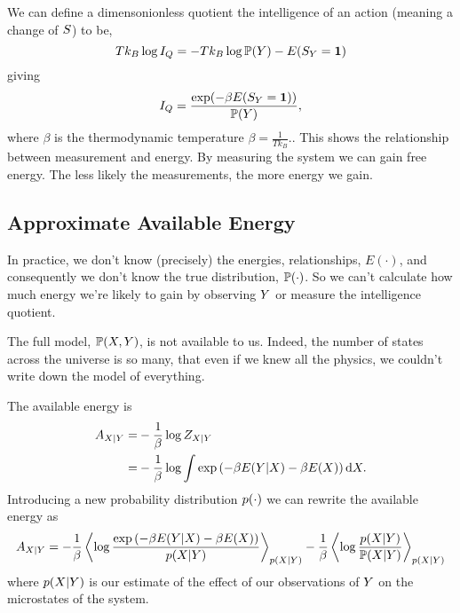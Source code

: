 \documentclass[]{article}
\begin{document}
We can define a dimensonionless quotient the intelligence of an action (meaning a change of $S$) to be,
\[
T k_B\log I_Q = -T k_B \log \mathbb{P}(Y) - E(S_Y=\mathbf{1})
\]
giving 
\[
I_Q = \frac{\exp(-\beta E(S_Y=\mathbf{1}))}{\mathbb{P}(Y)},\]
where $\beta$ is the thermodynamic temperature
\(
\beta = \frac{1}{Tk_B}.
\).
This shows the relationship between measurement and energy. By measuring
the system we can gain free energy. The less likely the measurements,
the more energy we gain.

\subsection{Approximate Available Energy}

In practice, we don't know (precisely) the energies, relationships,
\(E(\cdot)\), and consequently we don't know the true distribution,
\(\mathbb{P}(\cdot)\). So we can't calculate how much energy we're likely
to gain by observing \(Y\) or measure the intelligence quotient.

The full model, \(\mathbb{P}(X, Y)\), is not
available to us. Indeed, the number of states across the universe is so
many, that even if we knew all the physics, we couldn't write down the
model of everything.

The available energy is 
\begin{align*}
A_{X|Y} = & -\frac{1}{\beta} \log Z_{X|Y} \\
= & -\frac{1}{\beta} \log \int \exp\left(-\beta E(Y|X) -\beta E(X)\right) \text{d}X.
\end{align*}
Introducing a new probability distribution \(p(\cdot)\) we
can rewrite the available energy as 
\[
A_{X|Y} =  -\frac{1}{\beta}\left\langle \log \frac{\exp\left(-\beta E(Y|X) -\beta E(X)\right)}{p(X|Y) } \right\rangle_{p(X|Y) } - \frac{1}{\beta}\left\langle \log \frac{p(X|Y)}{\mathbb{P}(X|Y) } \right\rangle_{p(X|Y) }
\] 
where \(p(X|Y)\) is our
estimate of the effect of our observations of \(Y\) on the
microstates of the system.
\end{document}
